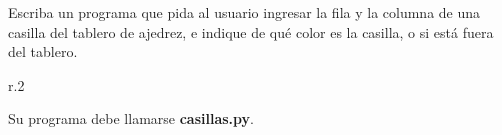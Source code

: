 \documentclass[12pt,spanish,letterpaper]{article}
\begin{document}
  Escriba un programa que pida al usuario
  ingresar la fila y la columna de una casilla del tablero de ajedrez,
  e indique de qué color es la casilla,
  o si está fuera del tablero.

  \begin{wrapfigure}{r}{.2\textwidth}
  \end{wrapfigure}

  \begin{minipage}[t]{.5\textwidth}
    
  \end{minipage}

  \begin{minipage}[t]{.5\textwidth}
    
  \end{minipage}

  \begin{minipage}[t]{.5\textwidth}
    
  \end{minipage}

  Su programa debe llamarse \textbf{casillas.py}.
\end{document}
